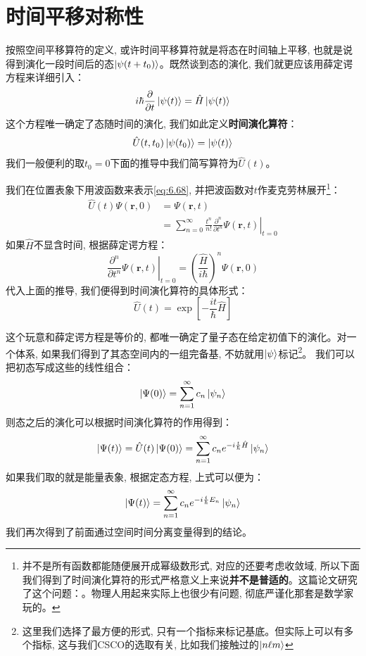 \section{时间平移对称性}
按照空间平移算符的定义, 或许时间平移算符就是将态在时间轴上平移, 也就是说得到演化一段时间后的态$\ket{\psi(t+t_0)}$。既然谈到态的演化, 我们就更应该用薛定谔方程来详细引入：
\[i\hbar\frac{\partial}{\partial t}\ket{\psi(t)}=\hat{H}\ket{\psi(t)}\]
这个方程唯一确定了态随时间的演化, 我们如此定义\textbf{时间演化算符}：
\begin{equation}
    \label{eq:6.68}
    \hat{U}(t,t_0)\ket{\psi(t_0)}=\ket{\psi(t)}
\end{equation}
我们一般便利的取$t_0=0$下面的推导中我们简写算符为$\hat{U}(t)$。

我们在位置表象下用波函数来表示\ref{eq:6.68}, 并把波函数对$t$作麦克劳林展开\footnote{并不是所有函数都能随便展开成幂级数形式, 对应的还要考虑收敛域, 所以下面我们得到了时间演化算符的形式严格意义上来说\textbf{并不是普适的}。这篇论文研究了这个问题：。物理人用起来实际上也很少有问题, 彻底严谨化那套是数学家玩的。}：
\begin{align*}
    \hat{U}(t)\Psi(\mathbf{r},0)&=\Psi(\mathbf{r},t)\\
    &=\sum_{n=0}^\infty \frac{t^n}{n!}\left.\frac{\partial^{n}}{\partial t^{n}} \Psi(\mathbf{r}, t)\right|_{t=0}
\end{align*}
如果$\hat{H}$不显含时间, 根据薛定谔方程：
\begin{equation}
    \left.\frac{\partial^{n}}{\partial t^{n}} \Psi(\mathbf{r}, t)\right|_{t=0}=\left(\frac{\hat{H}}{i\hbar}\right)^n\Psi(\mathbf{r},0)
\end{equation}
代入上面的推导, 我们便得到时间演化算符的具体形式：
\begin{equation}
    \label{eq:6.70}
    \boxed{\hat{U}(t)=\exp \left[-\frac{i t}{\hbar} \hat{H}\right]}
\end{equation}

这个玩意和薛定谔方程是等价的, 都唯一确定了量子态在给定初值下的演化。对一个体系, 如果我们得到了其态空间内的一组完备基, 不妨就用$\ket{\psi}$标记\footnote{这里我们选择了最方便的形式, 只有一个指标来标记基底。但实际上可以有多个指标, 这与我们CSCO的选取有关, 比如我们接触过的$\ket{n\ell m}$}。
我们可以把初态写成这些的线性组合：
\[\ket{\Psi(0)}=\sum_{n=1}^{\infty}c_n\ket{\psi_n}\]
则态之后的演化可以根据时间演化算符的作用得到：
\[\ket{\Psi(t)}=\hat{U}(t)\ket{\Psi(0)}=\sum_{n=1}^{\infty}c_ne^{-i\frac{t}{\hbar}\hat{H}}\ket{\psi_n}\]
如果我们取的就是能量表象, 根据定态方程, 上式可以便为：
\[\ket{\Psi(t)}=\sum_{n=1}^{\infty}c_ne^{-i\frac{t}{\hbar}E_n}\ket{\psi_n}\]
我们再次得到了前面通过空间时间分离变量得到的结论。

